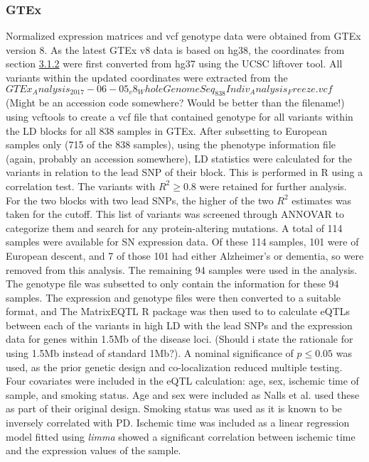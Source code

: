 \documentclass{article}
\begin{document}
\subsubsection{GTEx}
\label{subsec:GTEx}
Normalized expression matrices and vcf genotype data were obtained from GTEx version 8. As the latest GTEx v8 data is based on hg38, the coordinates from section \hyperref[subsubsec:LDblock]{3.1.2} were first converted from hg37 using the UCSC liftover tool\cite{Hinrichs2006The2006.}. All variants within the updated coordinates were extracted from the $GTEx_Analysis_2017-06-05_v8_WholeGenomeSeq_838Indiv_Analysis_Freeze.vcf$ (Might be an accession code somewhere? Would be better than the filename!) using vcftools\cite{Danecek2011TheVCFtools} to create a vcf file that contained genotype for all variants within the LD blocks for all 838 samples in GTEx. After subsetting to European samples only (715 of the 838 samples), using the phenotype information file (again, probably an accession somewhere), LD statistics were calculated for the variants in relation to the lead SNP of their block.  This is performed in R using a correlation test. The variants with $R^2\geq0.8$ were retained for further analysis. For the two blocks with two lead SNPs, the higher of the two $R^2$ estimates was taken for the cutoff. This list of variants was screened through ANNOVAR\cite{Wang2010ANNOVAR:Data} to categorize them and search for any protein-altering mutations.
A total of 114 samples were available for SN expression data. Of these 114 samples, 101 were of European descent, and  7 of those 101 had either Alzheimer's or dementia, so were removed from this analysis. The remaining 94 samples were used in the analysis. The genotype file was subsetted to only contain the information for these 94 samples. The expression and genotype files were then converted to a suitable format, and The MatrixEQTL R package\cite{Shabalin2012MatrixOperations.} was then used to to calculate eQTLs between each of the variants in high LD with the lead SNPs and the expression data for genes within 1.5Mb of the disease loci. (Should i state the rationale for using 1.5Mb instead of standard 1Mb?). A nominal significance of $p\leq0.05$ was used, as the prior genetic design and co-localization reduced multiple testing. Four covariates were included in the eQTL calculation: age, sex, ischemic time of sample, and smoking status. Age and sex were included as Nalls et al.\cite{Nalls2019IdentificationStudies} used these as part of their original design. Smoking status was used as it is known to be inversely correlated with PD\cite{Ben-Shlomo2024TheDisease}. Ischemic time was included as a linear regression model fitted using \textit{limma}\cite{Ritchie2015LimmaStudies} showed a significant correlation between ischemic time and the expression values of the sample.
\end{document}
